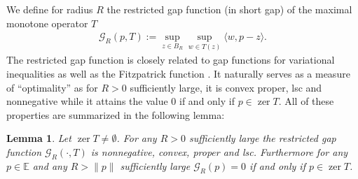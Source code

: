 \documentclass[11pt,onecolumn]{article}
\DeclareMathOperator{\zer}{zer}
\newtheorem{lemma}[lemma]{Lemma}
\theoremstyle{remark}
\begin{document}
We define for radius $R$ the restricted gap function (in short gap) of the maximal monotone operator $T$
\begin{align} \label{eq:primal_dual_gap}
    \mathcal{G}_R(p, T):= \sup_{z \in B_R} \sup_{w \in T(z)} \langle w, p - z\rangle.
\end{align}
The restricted gap function is closely related to gap functions for variational inequalities \cite{chen1997gap} as well as the Fitzpatrick function \cite[Definition 20.51]{BaCo110}. It naturally serves as a measure of ``optimality'' as for $R > 0$ sufficiently large, it is convex proper, lsc and nonnegative while it attains the value $0$ if and only if $p \in \zer T$. All of these properties are summarized in the following lemma:
\begin{lemma} \label{thm:gap_optimality}
	Let $\zer T \neq \emptyset$.
    For any $R > 0$ sufficiently large the restricted gap function $\mathcal{G}_R(\cdot, T)$ is nonnegative, convex, proper and lsc. Furthermore for any $p \in \mathbb{E}$ and any $R> \|p\|$ sufficiently large $\mathcal{G}_R(p)=0$ if and only if $p\in \zer T$.
\end{lemma}
\end{document}
